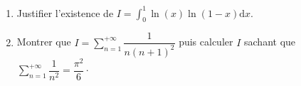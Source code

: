 \documentclass[a4paper,twoside,french,11pt]{VcCours}
\newcommand{\dx}{\text{d}x}
\newcommand{\dt}{\text{d}t}
\begin{document}
%

\begin{Exercice}{}
\begin{enumerate}
\item Justifier l'existence de $I= \int_{0}^1 \ln(x) \ln(1-x) \dx$.
\item Montrer que $I =\sum_{n=1}^{+ \infty} \dfrac{1}{n(n+1)^2}$ puis calculer $I$ sachant que $\sum_{n=1}^{+ \infty} \dfrac{1}{n^2} = \dfrac{\pi^2}{6}\cdot$
\end{enumerate}
\end{Exercice}
\end{document}
